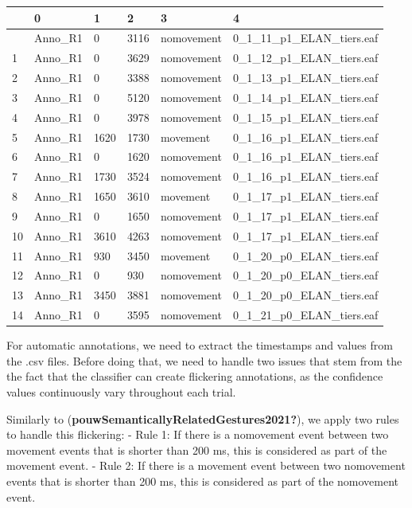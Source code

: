 \documentclass[
  letterpaper,
  DIV=11,
  numbers=noendperiod]{scrreprt}
\begin{document}
\begin{longtable}[]{@{}llllll@{}}
\toprule\noalign{}
& 0 & 1 & 2 & 3 & 4 \\
\midrule\noalign{}
\endhead
\bottomrule\noalign{}
\endlastfoot
0 & Anno\_R1 & 0 & 3116 & nomovement & 0\_1\_11\_p1\_ELAN\_tiers.eaf \\
1 & Anno\_R1 & 0 & 3629 & nomovement & 0\_1\_12\_p1\_ELAN\_tiers.eaf \\
2 & Anno\_R1 & 0 & 3388 & nomovement & 0\_1\_13\_p1\_ELAN\_tiers.eaf \\
3 & Anno\_R1 & 0 & 5120 & nomovement & 0\_1\_14\_p1\_ELAN\_tiers.eaf \\
4 & Anno\_R1 & 0 & 3978 & nomovement & 0\_1\_15\_p1\_ELAN\_tiers.eaf \\
5 & Anno\_R1 & 1620 & 1730 & movement & 0\_1\_16\_p1\_ELAN\_tiers.eaf \\
6 & Anno\_R1 & 0 & 1620 & nomovement & 0\_1\_16\_p1\_ELAN\_tiers.eaf \\
7 & Anno\_R1 & 1730 & 3524 & nomovement &
0\_1\_16\_p1\_ELAN\_tiers.eaf \\
8 & Anno\_R1 & 1650 & 3610 & movement & 0\_1\_17\_p1\_ELAN\_tiers.eaf \\
9 & Anno\_R1 & 0 & 1650 & nomovement & 0\_1\_17\_p1\_ELAN\_tiers.eaf \\
10 & Anno\_R1 & 3610 & 4263 & nomovement &
0\_1\_17\_p1\_ELAN\_tiers.eaf \\
11 & Anno\_R1 & 930 & 3450 & movement & 0\_1\_20\_p0\_ELAN\_tiers.eaf \\
12 & Anno\_R1 & 0 & 930 & nomovement & 0\_1\_20\_p0\_ELAN\_tiers.eaf \\
13 & Anno\_R1 & 3450 & 3881 & nomovement &
0\_1\_20\_p0\_ELAN\_tiers.eaf \\
14 & Anno\_R1 & 0 & 3595 & nomovement & 0\_1\_21\_p0\_ELAN\_tiers.eaf \\
\end{longtable}

For automatic annotations, we need to extract the timestamps and values
from the .csv files. Before doing that, we need to handle two issues
that stem from the the fact that the classifier can create flickering
annotations, as the confidence values continuously vary throughout each
trial.

Similarly to (\textbf{pouwSemanticallyRelatedGestures2021?}), we apply
two rules to handle this flickering: - Rule 1: If there is a nomovement
event between two movement events that is shorter than 200 ms, this is
considered as part of the movement event. - Rule 2: If there is a
movement event between two nomovement events that is shorter than 200
ms, this is considered as part of the nomovement event.
\end{document}
